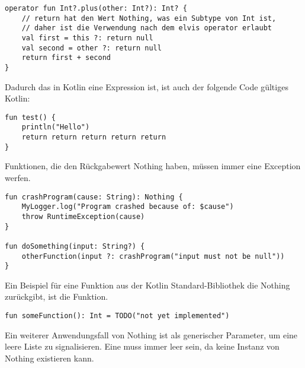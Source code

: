 \begin{verbatim}
operator fun Int?.plus(other: Int?): Int? {
    // return hat den Wert Nothing, was ein Subtype von Int ist,
    // daher ist die Verwendung nach dem elvis operator erlaubt
    val first = this ?: return null
    val second = other ?: return null
    return first + second
}
\end{verbatim}

Dadurch das  in Kotlin eine Expression ist, ist auch der folgende Code gültiges Kotlin:

\begin{verbatim}
fun test() {
    println("Hello")
    return return return return return
}
\end{verbatim}

Funktionen, die den Rückgabewert Nothing haben, müssen immer eine Exception werfen.

\begin{verbatim}
fun crashProgram(cause: String): Nothing {
    MyLogger.log("Program crashed because of: $cause")
    throw RuntimeException(cause)
}

fun doSomething(input: String?) {
    otherFunction(input ?: crashProgram("input must not be null"))
}
\end{verbatim}

Ein Beispiel für eine Funktion aus der Kotlin Standard-Bibliothek die Nothing zurückgibt, ist die
 Funktion.

\begin{verbatim}
fun someFunction(): Int = TODO("not yet implemented")
\end{verbatim}

Ein weiterer Anwendungsfall von Nothing ist als generischer Parameter, um \zB eine leere Liste zu signalisieren.
Eine  muss immer leer sein, da keine Instanz von Nothing existieren kann.

\renewcommand{\kapitelautor}{}
